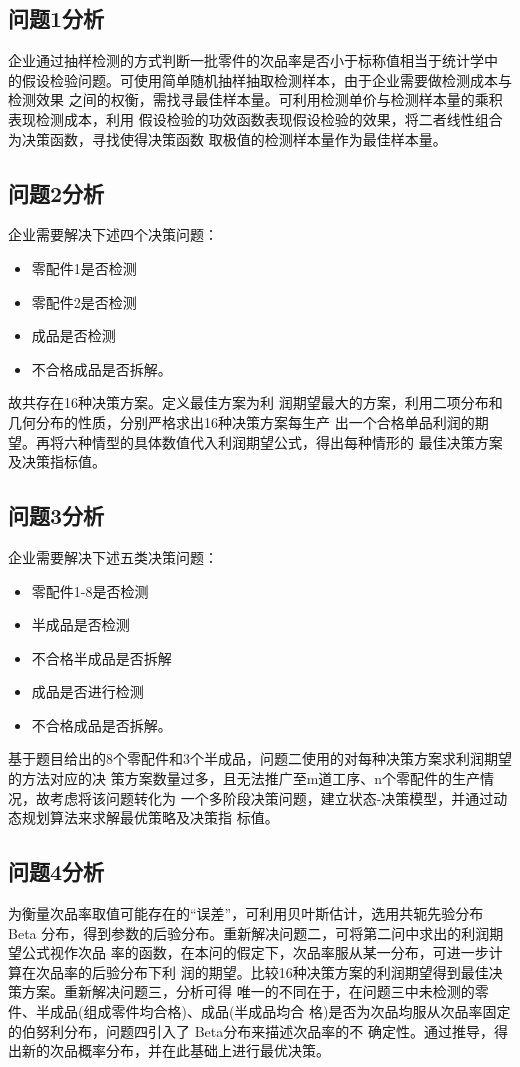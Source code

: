 \documentclass[withoutpreface,notoc]{cumcmthesis}
\begin{document}
	\subsection{问题1分析}
企业通过抽样检测的方式判断一批零件的次品率是否小于标称值相当于统计学中
的假设检验问题。可使用简单随机抽样抽取检测样本，由于企业需要做检测成本与检测效果
之间的权衡，需找寻最佳样本量。可利用检测单价与检测样本量的乘积表现检测成本，利用
假设检验的功效函数表现假设检验的效果，将二者线性组合为决策函数，寻找使得决策函数
取极值的检测样本量作为最佳样本量。


	\subsection{问题2分析}

企业需要解决下述四个决策问题：
	\begin{itemize}
		\item 零配件1是否检测
		\item 零配件2是否检测
		\item 成品是否检测
		\item 不合格成品是否拆解。
	\end{itemize}
故共存在16种决策方案。定义最佳方案为利
润期望最大的方案，利用二项分布和几何分布的性质，分别严格求出16种决策方案每生产
出一个合格单品利润的期望。再将六种情型的具体数值代入利润期望公式，得出每种情形的
最佳决策方案及决策指标值。



	\subsection{问题3分析}
企业需要解决下述五类决策问题：
	\begin{itemize}
		\item 零配件1-8是否检测
		\item 半成品是否检测
		\item 不合格半成品是否拆解
		\item 成品是否进行检测
		\item 不合格成品是否拆解。
	\end{itemize}
基于题目给出的8个零配件和3个半成品，问题二使用的对每种决策方案求利润期望的方法对应的决
策方案数量过多，且无法推广至m道工序、n个零配件的生产情况，故考虑将该问题转化为
一个多阶段决策问题，建立状态-决策模型，并通过动态规划算法来求解最优策略及决策指
标值。



	\subsection{问题4分析}
为衡量次品率取值可能存在的“误差”，可利用贝叶斯估计，选用共轭先验分布 Beta
分布，得到参数的后验分布。重新解决问题二，可将第二问中求出的利润期望公式视作次品
率的函数，在本问的假定下，次品率服从某一分布，可进一步计算在次品率的后验分布下利
润的期望。比较16种决策方案的利润期望得到最佳决策方案。重新解决问题三，分析可得
唯一的不同在于，在问题三中未检测的零件、半成品(组成零件均合格)、成品(半成品均合
格)是否为次品均服从次品率固定的伯努利分布，问题四引入了 Beta分布来描述次品率的不
确定性。通过推导，得出新的次品概率分布，并在此基础上进行最优决策。
\end{document}
